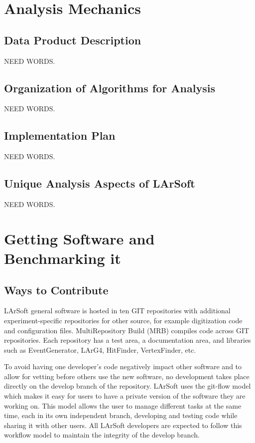 \documentclass[12pt]{elsarticle}
\begin{document}
{               
\section{Analysis Mechanics}

\subsection{Data Product Description}
NEED WORDS.

\subsection{Organization of Algorithms for Analysis}
NEED WORDS.

\subsection{Implementation Plan}
NEED WORDS.

\subsection{Unique Analysis Aspects of LArSoft}
NEED WORDS.

\section{Getting Software and Benchmarking it}
\subsection{Ways to Contribute}

LArSoft general software is hosted in ten GIT repositories with additional experiment-specific repositories for other source, for example digitization code and configuration files. MultiRepository Build (MRB) compiles code across GIT repositories. Each repository has a test area, a documentation area, and libraries such as EventGenerator, LArG4, HitFinder, VertexFinder, etc.\cite{gian}

To avoid having one developer's code negatively impact other software and to allow for vetting before others use the new software, no development takes place directly on the develop branch of the repository. LArSoft uses the git-flow\cite{git-flow} model which makes it easy for users to have a private version of the software they are working on. This model allows the user to manage different tasks at the same time, each in its own independent branch, developing and testing code while sharing it with other users.\cite{git-control} All LArSoft developers are expected to follow this workflow model to maintain the integrity of the develop branch.

}
\end{document}
